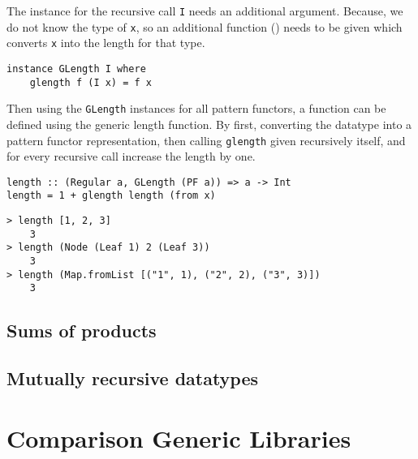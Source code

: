 The instance for the recursive call \texttt{I} needs an additional argument. Because, we do not know the type of \texttt{x}, so an additional function () needs to be given which converts \texttt{x} into the length for that type.

\begin{verbatim}
instance GLength I where
    glength f (I x) = f x
\end{verbatim}

Then using the \texttt{GLength} instances for all pattern functors, a function can be defined using the generic length function. By first, converting the datatype into a pattern functor representation, then calling \texttt{glength} given recursively itself, and for every recursive call increase the length by one. 

\begin{verbatim}
length :: (Regular a, GLength (PF a)) => a -> Int
length = 1 + glength length (from x)
\end{verbatim}

\begin{verbatim}
> length [1, 2, 3]
    3
> length (Node (Leaf 1) 2 (Leaf 3))
    3
> length (Map.fromList [("1", 1), ("2", 2), ("3", 3)])
    3
\end{verbatim}



\subsection{Sums of products}

\subsection{Mutually recursive datatypes}

\section{Comparison Generic Libraries}
\cite{rodriguez2008comparing}